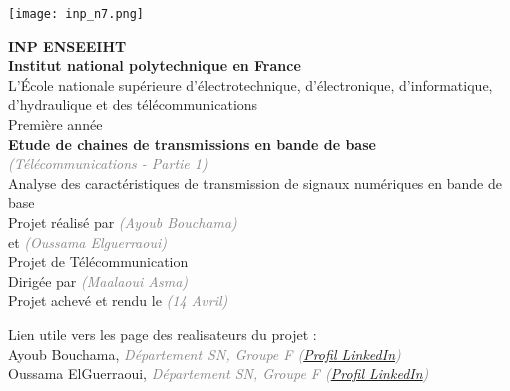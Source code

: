 \documentclass[11pt]{article}
\newcommand{\Gray}[1]{\textcolor{gray}{\textit{#1}}}
\begin{document}
\pagestyle{fancy}
\fancyhf{} %
\renewcommand{\headrulewidth}{0.4pt} %
\fancyfoot[C]{\thepage} %
\renewcommand{\footrulewidth}{0.4pt} %


\hfill
\texttt{[image: inp\_n7.png]}

\vspace*{8mm}

\begin{center}
\LARGE
{\bfseries
INP ENSEEIHT\\[2mm]
Institut national polytechnique en France\\[3mm]
}
\large 
L'École nationale supérieure d'électrotechnique, d'électronique, d'informatique, d'hydraulique et des télécommunications \\[2mm]
Première année\\[10mm]
\Huge
{\bfseries Etude de chaines de transmissions en bande de base
}\\
\Gray{\LARGE (Télécommunications - Partie 1)}\\[6mm]
\huge 
Analyse des caractéristiques de transmission de signaux numériques en bande de base\\[8mm]

\Large 
Projet réalisé par \Gray{(Ayoub Bouchama)} \\[1mm]
et \Gray{(Oussama Elguerraoui)} \\[6mm]
Projet de Télécommunication \\[6mm]
Dirigée par  \Gray{(Maalaoui Asma)}\\[8mm]
Projet achevé et rendu le \Gray{(14 Avril)}\\[10mm]

\end{center}

Lien utile vers les page des realisateurs du projet :\\[3mm]
Ayoub Bouchama, \Gray{Département SN, Groupe F (\href{https://www.linkedin.com/in/ayoubbouchama/}{Profil LinkedIn}) }\\
Oussama ElGuerraoui, \Gray{Département SN, Groupe F (\href{https://www.linkedin.com/in/oussama-elguerraoui-4770b51aa/}{Profil LinkedIn}) }\\

\newpage
\parskip 7pt
\end{document}
